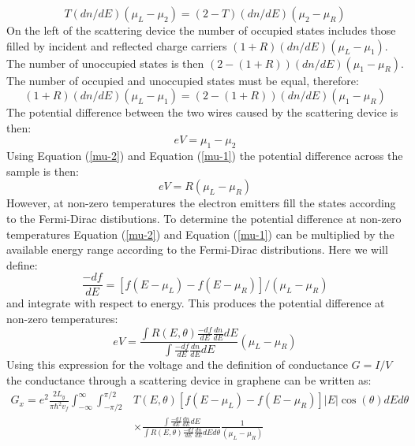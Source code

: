 			\begin{equation}
				T\left(dn/dE\right)\left(\mu_{L}-\mu_{2}\right)=\left(2-T\right)\left(dn/dE\right)\left(\mu_{2}-\mu_{R}\right)
				\label{mu-2}
			\end{equation}
			On the left of the scattering device the number of occupied states includes those filled by incident and reflected charge carriers $\left(1+R\right)\left(dn/dE\right)\left(\mu_{L}-\mu_{1}\right)$. The number of unoccupied states is then $\left(2-\left(1+R\right)\right)\left(dn/dE\right)\left(\mu_{1}-\mu_{R}\right)$. The number of occupied and unoccupied states must be equal, therefore:
			\begin{equation}
				\left(1+R\right)\left(dn/dE\right)\left(\mu_{L}-\mu_{1}\right)=\left(2-\left(1+R\right)\right)\left(dn/dE\right)\left(\mu_{1}-\mu_{R}\right)
				\label{mu-1}
			\end{equation}
			The potential difference between the two wires caused by the scattering device is then:
			\begin{equation}
				eV=\mu_{1}-\mu_{2}
			\end{equation}
			Using Equation (\ref{mu-2}) and Equation (\ref{mu-1}) the potential difference across the sample is then:
			\begin{equation}
				eV=R\left(\mu_{L}-\mu_{R}\right)
			\end{equation}
			However, at non-zero temperatures the electron emitters fill the states according to the Fermi-Dirac distibutions. To determine the potential difference at non-zero temperatures Equation (\ref{mu-2}) and Equation (\ref{mu-1}) can be multiplied by the available energy range according to the Fermi-Dirac distributions. Here we will define:
			\begin{equation}
				\frac{-df}{dE}=\left[f\left(E-\mu_{L}\right)-f\left(E-\mu_{R}\right)\right]/\left(\mu_{L}-\mu_{R}\right)
			\end{equation}
			and integrate with respect to energy. This produces the potential difference at non-zero temperatures:
			\begin{equation}
				eV=\frac{\int R\left(E,\theta\right) \frac{-df}{dE} \frac{dn}{dE}dE}{\int\frac{-df}{dE} \frac{dn}{dE}dE}\left(\mu_{L}-\mu_{R}\right)
			\end{equation}
			Using this expression for the voltage and the definition of conductance $G=I/V$ the conductance through a scattering device in graphene can be written as:
			\begin{align}
				G_{x}=e^{2}\frac{2L_{y}}{\pi\hbar^{2}v_{f}}\int^{\infty}_{-\infty}\int^{\pi/2}_{-\pi/2}&T\left(E,\theta\right)\left[f\left(E-\mu_{L}\right)-f\left(E-\mu_{R}\right)\right]|E|\cos(\theta)dEd\theta\\
				&\times\frac{\int\frac{-df}{dE} \frac{dn}{dE}dE}{\int R\left(E,\theta\right) \frac{-df}{dE} \frac{dn}{dE}dEd\theta}\frac{1}{\left(\mu_{L}-\mu_{R}\right)}
			\end{align}
